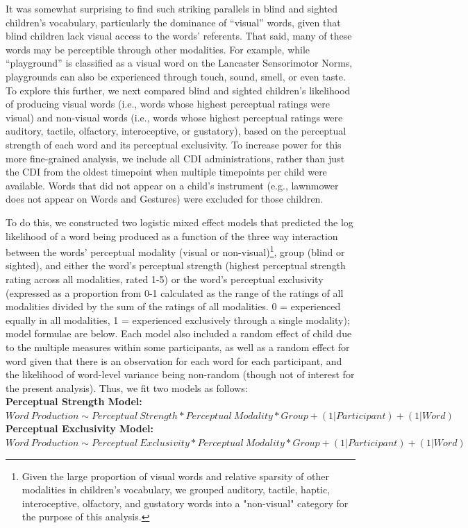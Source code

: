 \documentclass[english,man,floatsintext]{apa6}
\begin{document}
It was somewhat surprising to find such striking parallels in blind and sighted children's vocabulary, particularly the dominance of \enquote{visual} words, given that blind children lack visual access to the words' referents. That said, many of these words may be perceptible through other modalities. For example, while \enquote{playground} is classified as a visual word on the Lancaster Sensorimotor Norms, playgrounds can also be experienced through touch, sound, smell, or even taste. To explore this further, we next compared blind and sighted children's likelihood of producing visual words (i.e., words whose highest perceptual ratings were visual) and non-visual words (i.e., words whose highest perceptual ratings were auditory, tactile, olfactory, interoceptive, or gustatory), based on the perceptual strength of each word and its perceptual exclusivity. To increase power for this more fine-grained analysis, we include all CDI administrations, rather than just the CDI from the oldest timepoint when multiple timepoints per child were available. Words that did not appear on a child's instrument (e.g., lawnmower does not appear on Words and Gestures) were excluded for those children.

To do this, we constructed two logistic mixed effect models that predicted the log likelihood of a word being produced as a function of the three way interaction between the words' perceptual modality (visual or non-visual)\footnote{Given the large proportion of visual words and relative sparsity of other modalities in children's vocabulary, we grouped auditory, tactile, haptic, interoceptive, olfactory, and gustatory words into a "non-visual" category for the purpose of this analysis.}, group (blind or sighted), and either the word's perceptual strength (highest perceptual strength rating across all modalities, rated 1-5) or the word's perceptual exclusivity (expressed as a proportion from 0-1 calculated as the range of the ratings of all modalities divided by the sum of the ratings of all modalities. 0 = experienced equally in all modalities, 1 = experienced exclusively through a single modality); model formulae are below. Each model also included a random effect of child due to the multiple measures within some participants, as well as a random effect for word given that there is an observation for each word for each participant, and the likelihood of word-level variance being non-random (though not of interest for the present analysis). Thus, we fit two models as follows:\\
\textbf{Perceptual Strength Model:} \(Word\ Production \sim Perceptual\ Strength * Perceptual\ Modality * Group + (1|Participant) + (1|Word)\)\\
\textbf{Perceptual Exclusivity Model:} \(Word\ Production \sim Perceptual\ Exclusivity * Perceptual\ Modality * Group + (1|Participant) + (1|Word)\)
\end{document}
